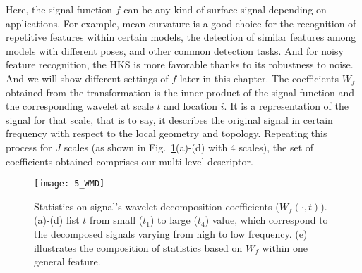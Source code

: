 Here, the signal function $f$ can be any kind of
surface signal depending on applications. For example, mean curvature
is a good choice for the recognition of repetitive features within certain
models, the detection of similar features among models with different poses,
and other common detection tasks. And for noisy feature recognition,
the HKS is more favorable thanks to its robustness to noise.
And we will show different settings of $f$ later in this chapter.
The coefficients $W_f$ obtained from the transformation is the inner
product of the signal function and the corresponding wavelet at scale
$t$ and location $i$. It is a representation of the signal for that
scale, that is to say, it describes the original signal in certain
frequency with respect to the local geometry and topology. Repeating
this process for $J$ scales (as shown in Fig.~\ref{wmd}(a)-(d) with 4
scales), the set of coefficients obtained comprises our multi-level
descriptor.

\begin{figure}[!to]
\begin{center}
\texttt{[image: 5\_WMD]}
\end{center}
\caption{Statistics on signal's wavelet decomposition
  coefficients ($W_f(\cdot,t)$). (a)-(d) list $t$ from small ($t_1$)
  to large ($t_4$) value, which correspond to the decomposed signals
  varying from high to low frequency. (e) illustrates the composition of
  statistics based on $W_f$ within one general feature.}
\label{wmd}
\end{figure}


